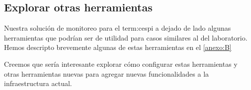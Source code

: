 \subsection{Explorar otras herramientas}
\label{explorar-otras-herramientas}

Nuestra solución de monitoreo para el \gls{term:cespi} a dejado de lado algunas
herramientas que podrían ser de utilidad para casos similares al del
laboratorio. Hemos descripto brevemente algunas de estas herramientas en el
\autoref{anexo:B}

Creemos que sería interesante explorar cómo configurar estas herramientas y
otras herramientas nuevas para agregar nuevas funcionalidades a la
infraestructura actual.

